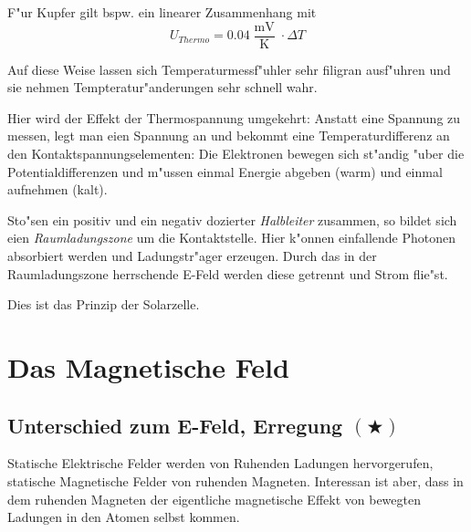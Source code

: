 \begin{description}[\setlabelstyle{\bfseries\slshape}]
   F"ur Kupfer gilt bspw. ein linearer Zusammenhang mit
   \begin{equation*}
      \label{eqn_differenz-c87}
      U_{Thermo} = 0.04 \frac{\operatorname{mV}}{\operatorname{K}} \cdot \Delta T
   \end{equation*}

   Auf diese Weise lassen sich Temperaturmessf"uhler sehr filigran
   ausf"uhren und sie nehmen Tempteratur"anderungen sehr schnell wahr.

\item[Peltierelement] Hier wird der Effekt der Thermospannung
   umgekehrt: Anstatt eine Spannung zu messen, legt man eien Spannung
   an und bekommt eine Temperaturdifferenz an den
   Kontaktspannungselementen: Die Elektronen bewegen sich st"andig "uber
   die Potentialdifferenzen und m"ussen einmal Energie abgeben (warm) und
   einmal aufnehmen (kalt).

\item[\index{Photospannung}Photospannung] Sto"sen ein positiv und ein
   negativ dozierter \emph{Halbleiter} zusammen, so bildet sich eien
   \emph{Raumladungszone} um die Kontaktstelle. Hier k"onnen
   einfallende Photonen absorbiert werden und Ladungstr"ager
   erzeugen. Durch das in der Raumladungszone herrschende E-Feld
   werden diese getrennt und Strom flie"st.

   Dies ist das Prinzip der Solarzelle.
\end{description}















\section{Das Magnetische Feld}




\subsection{Unterschied zum E-Feld, Erregung $(\bigstar)$}
\label{kap_unterschied-zum-e-feld-erregung}
\label{kap_magnetische-feld}

Statische Elektrische Felder werden von Ruhenden Ladungen
hervorgerufen, statische Magnetische Felder von ruhenden
Magneten. Interessan ist aber, dass in dem ruhenden Magneten der
eigentliche magnetische Effekt von bewegten Ladungen in den Atomen
selbst kommen.

